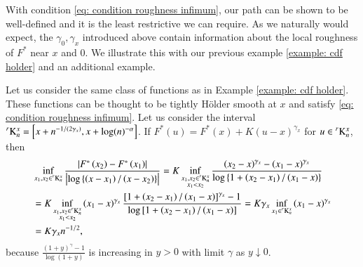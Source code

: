With condition \eqref{eq: condition roughness infimum}, our path can be shown to be well-defined and it is the least restrictive we can require. As we naturally would expect, the $\gamma_0, \gamma_x$ introduced above contain information about the local roughness of $F^*$ near $x$ and $0$. We illustrate this with our previous example \ref{example: cdf holder} and an additional example.
\begin{example}
Let us consider the same class of functions as in Example \ref{example: cdf holder}. These functions can be thought to be tightly Hölder smooth at $x$ and satisfy \eqref{eq: condition roughness infimum}. Let us consider the interval $\prescript{r}{}{\mathrm{K}}^{x}_n =\left[x+n^{-1 /(2 \gamma_x)}, x+\log (n)^{-\alpha}\right]$. If $F^*(u)=F^*(x)+K(u-x)^{\gamma_x}$ for $u \in \prescript{r}{}{\mathrm{K}}^{x}_n$, then
$$
\begin{aligned}
&\inf _{x_1, x_2 \in \prescript{r}{}{\mathrm{K}}^{x}_n}  \frac{\left|F^*\left(x_2\right)-F^*\left(x_1\right)\right|}{\left|\log \left\{\left(x-x_1\right) /\left(x-x_2\right)\right\}\right|} =K \inf_{ \substack{x_1, x_2 \in \prescript{r}{}{\mathrm{K}}^{x}_n \\ x_1<x_2}} \frac{\left(x_2-x\right)^{\gamma_x}-\left(x_1-x\right)^{\gamma_x}}{\log \left\{1+\left(x_2-x_1\right) /\left(x_1-x\right)\right\}}  \\
&=K \inf _{\substack{x_1, x_2 \in \prescript{r}{}{\mathrm{K}}^{x}_n \\ x_1<x_2}}\left(x_1-x\right)^{\gamma_x} \frac{\left[1+\left(x_2-x_1\right) /\left(x_1-x\right)\right]^{\gamma_x}-1}{\log \left[1+\left(x_2-x_1\right) /\left(x_1-x\right)\right]}  =K \gamma_x \inf _{x_1 \in \prescript{r}{}{\mathrm{K}}^{x}_n }\left(x_1-x\right)^{\gamma_x} \\
&=K \gamma_x n^{-1 / 2},
\end{aligned}
$$
because $\frac{(1+y)^\gamma-1}{\log (1+y)}$ is increasing in $y>0$ with limit $\gamma$ as $y \downarrow 0$.
\end{example}
